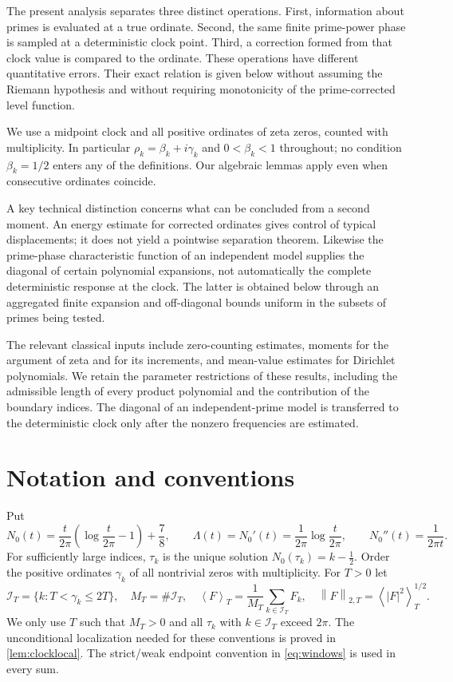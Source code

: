 \documentclass[11pt,reqno]{amsart}
\numberwithin{equation}{section}
\newcommand{\av}[1]{\left\langle #1\right\rangle_T}
\newcommand{\norm}[1]{\left\|#1\right\|_{2,T}}
\newcommand{\calI}{\mathcal I_T}
\newcommand{\lamb}{\Lambda}
\begin{document}
The present analysis separates three distinct operations. First, information about primes is evaluated at a true ordinate. Second, the same finite prime-power phase is sampled at a deterministic clock point. Third, a correction formed from that clock value is compared to the ordinate. These operations have different quantitative errors. Their exact relation is given below without assuming the Riemann hypothesis and without requiring monotonicity of the prime-corrected level function.

We use a midpoint clock and all positive ordinates of zeta zeros, counted with multiplicity. In particular $\rho_k=\beta_k+i\gamma_k$ and $0<\beta_k<1$ throughout; no condition $\beta_k=1/2$ enters any of the definitions. Our algebraic lemmas apply even when consecutive ordinates coincide.

A key technical distinction concerns what can be concluded from a second moment. An energy estimate for corrected ordinates gives control of typical displacements; it does not yield a pointwise separation theorem. Likewise the prime-phase characteristic function of an independent model supplies the diagonal of certain polynomial expansions, not automatically the complete deterministic response at the clock. The latter is obtained below through an aggregated finite expansion and off-diagonal bounds uniform in the subsets of primes being tested.

The relevant classical inputs include zero-counting estimates, moments for the argument of zeta and for its increments, and mean-value estimates for Dirichlet polynomials. We retain the parameter restrictions of these results, including the admissible length of every product polynomial and the contribution of the boundary indices. The diagonal of an independent-prime model is transferred to the deterministic clock only after the nonzero frequencies are estimated.


\section{Notation and conventions}\label{sec:notation}
Put
\begin{equation}\label{eq:N0}
N_0(t)=\frac{t}{2\pi}\left(\log\frac{t}{2\pi}-1\right)+\frac78,
\qquad \lamb(t)=N_0'(t)=\frac1{2\pi}\log\frac{t}{2\pi},\qquad
N_0''(t)=\frac1{2\pi t}.
\end{equation}
For sufficiently large indices, $\tau_k$ is the unique solution $N_0(\tau_k)=k-\tfrac12$. Order the positive ordinates $\gamma_k$ of all nontrivial zeros with multiplicity. For $T>0$ let
\begin{equation}\label{eq:windows}
\calI=\{k:T<\gamma_k\le 2T\},\quad M_T=\#\calI,
\quad\av{F}=\frac1{M_T}\sum_{k\in\calI}F_k,\quad \norm{F}=\av{|F|^2}^{1/2}.
\end{equation}
We only use $T$ such that $M_T>0$ and all $\tau_k$ with $k\in\calI$ exceed $2\pi$.  The unconditional localization needed for these conventions is proved in \cref{lem:clocklocal}. The strict/weak endpoint convention in \eqref{eq:windows} is used in every sum.
\end{document}
